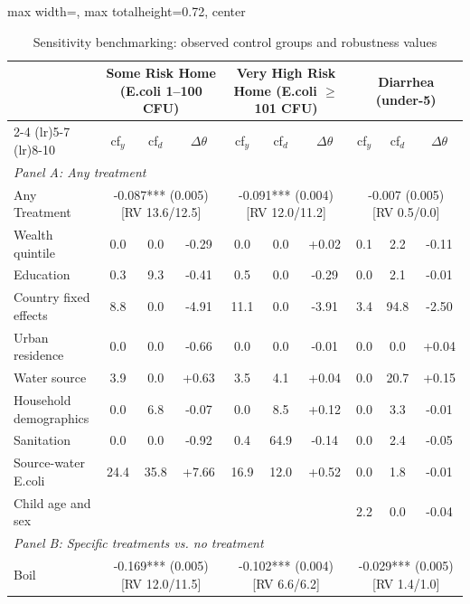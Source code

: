 \begin{landscape}
\begin{table}[p]
\centering
\caption{Sensitivity benchmarking: observed control groups and robustness values}
\label{tab:sensitivity-benchmark}
\scriptsize\setlength{\tabcolsep}{3pt}
\renewcommand{\arraystretch}{0.92}
\begin{adjustbox}{max width=\linewidth, max totalheight=0.72\textwidth, center}
\begin{tabular}{l|ccc|ccc|ccc}
\toprule
 & \multicolumn{3}{c}{Some Risk Home (E.coli 1--100 CFU)} & \multicolumn{3}{c}{Very High Risk Home (E.coli $\geq$ 101 CFU)} & \multicolumn{3}{c}{Diarrhea (under-5)} \\
\cmidrule(lr){2-4} \cmidrule(lr){5-7} \cmidrule(lr){8-10}
 & cf$_y$ & cf$_d$ & $\Delta\theta$ & cf$_y$ & cf$_d$ & $\Delta\theta$ & cf$_y$ & cf$_d$ & $\Delta\theta$ \\
\midrule
\multicolumn{10}{l}{\textit{Panel A: Any treatment}} \\
Any Treatment & \multicolumn{3}{c}{-0.087*** (0.005) {\scriptsize[RV 13.6/12.5]}} & \multicolumn{3}{c}{-0.091*** (0.004) {\scriptsize[RV 12.0/11.2]}} & \multicolumn{3}{c}{-0.007 (0.005) {\scriptsize[RV 0.5/0.0]}} \\
\quad Wealth quintile & 0.0 & 0.0 & -0.29 & 0.0 & 0.0 & +0.02 & 0.1 & 2.2 & -0.11 \\
\quad Education & 0.3 & 9.3 & -0.41 & 0.5 & 0.0 & -0.29 & 0.0 & 2.1 & -0.01 \\
\quad Country fixed effects & 8.8 & 0.0 & -4.91 & 11.1 & 0.0 & -3.91 & 3.4 & 94.8 & -2.50 \\
\quad Urban residence & 0.0 & 0.0 & -0.66 & 0.0 & 0.0 & -0.01 & 0.0 & 0.0 & +0.04 \\
\quad Water source & 3.9 & 0.0 & +0.63 & 3.5 & 4.1 & +0.04 & 0.0 & 20.7 & +0.15 \\
\quad Household demographics & 0.0 & 6.8 & -0.07 & 0.0 & 8.5 & +0.12 & 0.0 & 3.3 & -0.01 \\
\quad Sanitation & 0.0 & 0.0 & -0.92 & 0.4 & 64.9 & -0.14 & 0.0 & 2.4 & -0.05 \\
\quad Source-water E.coli & 24.4 & 35.8 & +7.66 & 16.9 & 12.0 & +0.52 & 0.0 & 1.8 & -0.01 \\
\quad Child age and sex &  &  &  &  &  &  & 2.2 & 0.0 & -0.04 \\
\midrule
\multicolumn{10}{l}{\textit{Panel B: Specific treatments vs. no treatment}} \\
Boil & \multicolumn{3}{c}{-0.169*** (0.005) {\scriptsize[RV 12.0/11.5]}} & \multicolumn{3}{c}{-0.102*** (0.004) {\scriptsize[RV 6.6/6.2]}} & \multicolumn{3}{c}{-0.029*** (0.005) {\scriptsize[RV 1.4/1.0]}} \\

\end{tabular}
\end{adjustbox}
\end{table}
\end{landscape}
